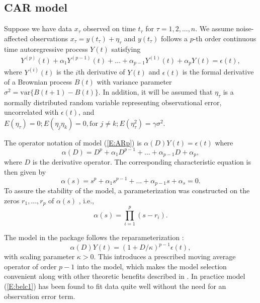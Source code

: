 

\subsection{CAR model}
Suppose we have data $x_{\tau}$ observed on time $t_{\tau}$ for $\tau=1,2, ...,n$. We assume noise-affected observations $x_{\tau}=y(t_{\tau})+\eta_{\tau}$ and $y(t_{\tau})$ follows a $p$-th order continuous time autoregressive process $Y(t)$ satisfying
\begin{align}\label{E:ARp}
     Y^{(p)}(t)+\alpha_1Y^{(p-1)}(t)+\ldots+\alpha_{p-1}Y^{(1)}(t)+\alpha_pY(t)=\epsilon(t),
\end{align}
where $Y^{(i)}(t)$ is the $i$th derivative of $Y(t)$ and $\epsilon(t)$ is the formal derivative of a Brownian process $B(t)$ with variance parameter $\sigma^2 = \textrm{var}\{B(t +1) - B(t)\}$.
In addition, it will be assumed that $\eta_{\tau}$ is a normally distributed random variable representing observational error, uncorrelated with $\epsilon(t)$, and $
E(\eta_\tau) =0;
E(\eta_j \eta_k) =0, \mbox{for } j\neq k; 
E(\eta_\tau^2) =\gamma\sigma^2.$

The operator notation of model (\ref{E:ARp}) is $\alpha(D)Y(t)=\epsilon(t)$ where
\begin{equation}
\alpha(D)=D^p+\alpha_1 D^{p-1}+...+\alpha_{p-1} D+\alpha_{p},
\end{equation}
where $D$ is the derivative operator. The corresponding characteristic equation is then given by
\begin{equation}
\alpha(s)=s^p+\alpha_1 s^{p-1}+...+\alpha_{p-1} s+\alpha_{s}=0.
\end{equation}
To assure the stability of the model, a parameterization 
was constructed on the zeros $r_1,...,r_p$ of $\alpha(s)$ \citep{Jone:1981}, i.e., 
\begin{equation}\label{E:carfac}
\alpha(s)=\prod_{i=1}^{p}(s-r_i).
\end{equation}


The model in the  package follows the reparameterization \citep{Belc:Hamp:Tunn:1994}:
\begin{equation}\label{E:belc1}
\alpha(D)Y(t)=(1+D/\kappa)^{p-1}\epsilon(t),
\end{equation}
with scaling parameter $\kappa>0$. This introduces a prescribed moving average operator of order $p-1$ into the model, which makes the model selection convenient along with other theoretic benefits described in \citet{Belc:Hamp:Tunn:1994}. 
In practice model (\ref{E:belc1}) has been found to fit data quite well without the need for an observation error term.

